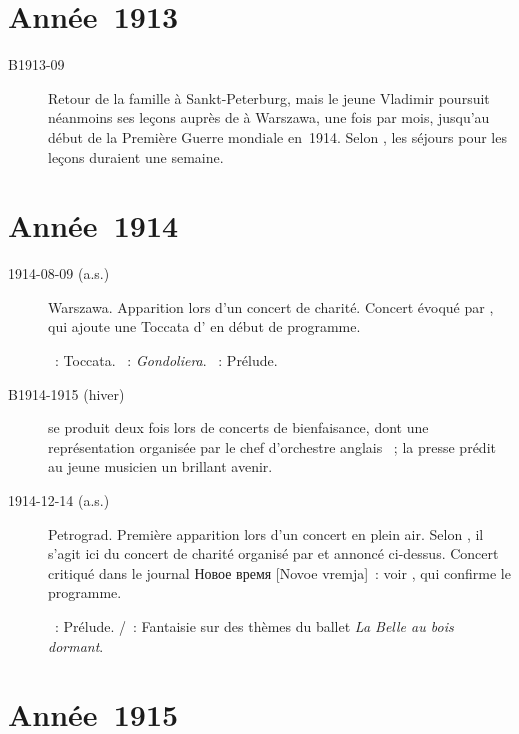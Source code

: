 \section{Année~1913}

\begin{description}
 \item[B1913-09]
 Retour de la famille \Sofronitsky{} à Sankt-Peterburg, mais le jeune
 Vladimir poursuit néanmoins ses leçons auprès de \Michalowski{} à Warszawa,
 une fois par mois, jusqu'au début de la Première Guerre mondiale en~1914.
 Selon \citet[p.~140]{Nekrasova08}, les séjours pour les leçons duraient une
 semaine.
\end{description}

\section{Année~1914}

\begin{description}
 \item[1914-08-09 (a.s.)]
 Warszawa.
 Apparition lors d'un concert de charité.
 Concert évoqué par \citet[p.~25]{Sofronitsky82a}, qui ajoute une Toccata
 d'\ARubinstein{} en début de programme.

 \textsc{\ARubinstein{}}~: Toccata.
 \textsc{\Liszt{}}~: \emph{Gondoliera}.
 \textsc{\Mendelssohn{}}~: Prélude.
 \item[B1914-1915 (hiver)]
 \VSofronitsky{} se produit deux fois lors de concerts de bienfaisance, dont
 une représentation organisée par le chef d'orchestre anglais \ACoates{}
 \citep[voir][p.~142]{Nekrasova08}~; la presse prédit au jeune musicien un
 brillant avenir.
 \item[1914-12-14 (a.s.)]
 Petrograd.
 Première apparition lors d'un concert en plein air.
 Selon \citet[p.~25]{Sofronitsky82a}, il s'agit ici du concert de charité
 organisé par \ACoates{} et annoncé ci-dessus.
 Concert critiqué dans le journal \foreignlanguage{russian}{Новое время}
 [Novoe vremja]~: voir \citet[p.~25]{Sofronitsky82a}, qui confirme le
 programme.

 \textsc{\Rachmaninov{}}~: Prélude.
 \textsc{\Tchaikovski{}/\Pabst{}}~: Fantaisie sur des thèmes du ballet
 \emph{La Belle au bois dormant}.
\end{description}

\section{Année~1915}

